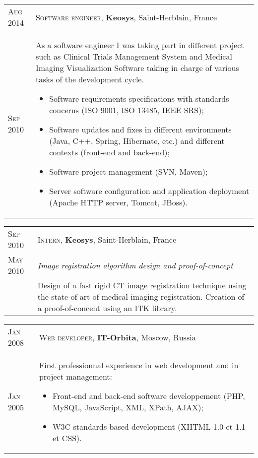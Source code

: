 \documentclass[letter,10pt]{article} %
\begin{document}
\begin{tabular}{R{2cm}|p{15.5cm}}
\textsc{Aug 2014} & \textsc{Software engineer}, \normalsize\textbf{Keosys},
Saint-Herblain, France
\\
\textsc{Sep 2010} & \vspace{-1mm} As a software engineer I was taking part in
different project such as Clinical Trials Management System and Medical Imaging
Visualization Software taking in charge of various tasks of the
development cycle.
\begin{itemize} 
\item Software requirements specifications with standards concerns (ISO 9001,
ISO 13485, IEEE SRS);
\item Software updates and fixes in different environments (Java, C++, Spring,
Hibernate, etc.) and different contexts (front-end and back-end);
\item Software project management (SVN, Maven);
\item Server software configuration and application deployment 
(Apache HTTP server, Tomcat, JBoss).
\end{itemize} 

\end{tabular}


\begin{tabular}{R{2cm}|p{15.5cm}}

\textsc{Sep 2010} & \textsc{Intern}, \normalsize\textbf{Keosys}, Saint-Herblain,
France \\
\textsc{May 2010} & \emph{Image registration algorithm design and
proof-of-concept}
\\
& \vspace{-1mm} Design of a fast rigid CT image registration technique using the
state-of-art of medical imaging registration. Creation of a proof-of-concent
using an ITK library.

\end{tabular}

\begin{tabular}{R{2cm}|p{15.5cm}}

\textsc{Jan 2008} & \textsc{Web developer}, \normalsize\textbf{IT-Orbita},
Moscow, Russia \\
\textsc{Jan 2005} & \vspace{-1mm}First professionnal experience in web
development and in project management:
\begin{itemize}
\item Front-end and back-end software developpement (PHP, MySQL, JavaScript,
XML, XPath, AJAX);
\item W3C standards based development (XHTML 1.0 et 1.1 et CSS).
\end{itemize}\\

\end{tabular}
\end{document}

